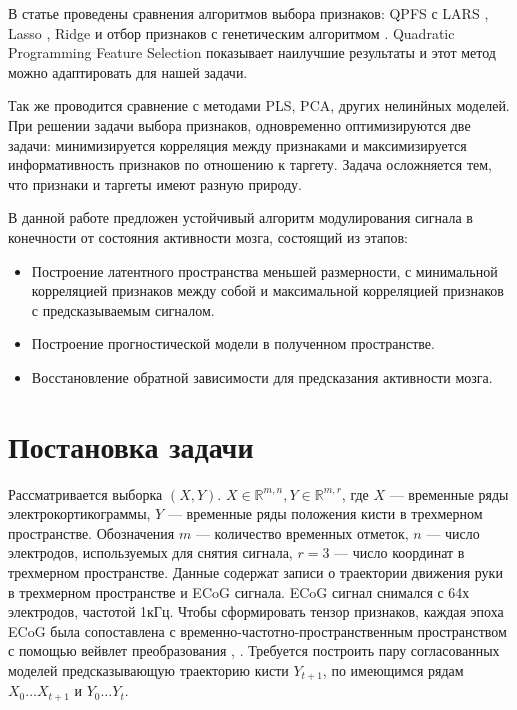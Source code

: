\documentclass{article}
\begin{document}
В статье \cite{qpfs} проведены сравнения алгоритмов выбора признаков: QPFS \cite{qpfs} с LARS \cite{MICHE20112413}, Lasso \cite{zhao2007stagewise}, Ridge \cite{ridge} и отбор признаков с генетическим алгоритмом \cite{tan2008genetic}. Quadratic Programming Feature Selection \cite{qpfs} показывает наилучшие результаты и этот метод можно адаптировать для нашей задачи. \par
Так же проводится сравнение с методами PLS, PCA, других нелинйных моделей.  При решении задачи выбора признаков, одновременно оптимизируются две задачи: минимизируется корреляция между признаками и максимизируется информативность признаков по отношению к таргету. Задача осложняется тем, что признаки и таргеты имеют разную природу. \par
В данной работе предложен устойчивый алгоритм модулирования сигнала в конечности от состояния активности мозга, состоящий из этапов:
\begin{itemize}
    \item Построение латентного пространства меньшей размерности, с минимальной корреляцией признаков между собой и максимальной корреляцией признаков с предсказываемым сигналом.
    \item Построение прогностической модели в полученном пространстве.
     \item Восстановление обратной зависимости для предсказания активности мозга.
\end{itemize}

\section{Постановка задачи}

Рассматривается выборка $(X, Y).$ $ X \in \mathbb{R}^{m, n},Y \in \mathbb{R}^{m, r}$, где $X$ --- временные ряды электрокортикограммы, $Y$ --- временные ряды положения кисти в трехмерном пространстве. Обозначения $m$ --- количество временных отметок, $n$ ---  число электродов, используемых для снятия сигнала, $r = 3$ --- число координат в трехмерном пространстве. Данные содержат записи о траектории движения руки в трехмерном пространстве и ECoG сигнала. ECoG сигнал снимался с 64х электродов, частотой 1кГц. Чтобы сформировать тензор признаков, каждая эпоха ECoG была сопоставлена с временно-частотно-пространственным пространством с помощью вейвлет преобразования \cite{eliseyev2016penalized}, \cite{chao2010long}. Требуется построить пару согласованных моделей предсказывающую траекторию кисти $Y_{t+1}$, по имеющимся рядам $X_0 \dots X_{t+1}$ и $Y_0 \dots Y_t$.
\end{document}
